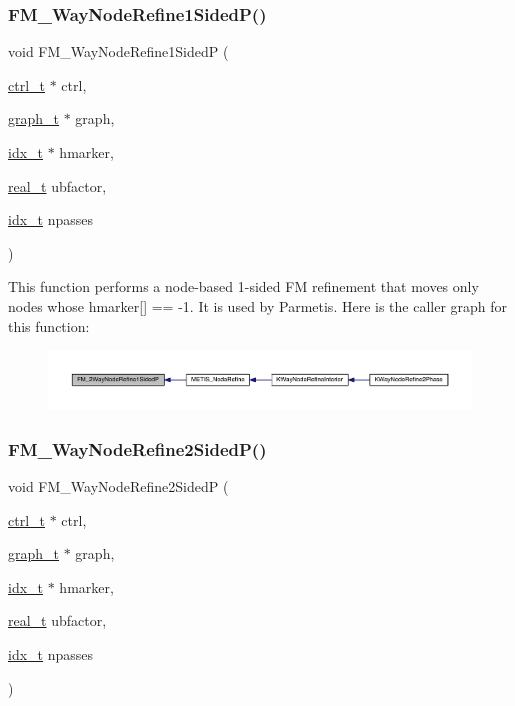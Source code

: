\subsubsection{\texorpdfstring{F\+M\+\_\+Way\+Node\+Refine1\+Sided\+P()}{FM\_2WayNodeRefine1SidedP()}}
{\footnotesize\ttfamily void F\+M\+\_\+Way\+Node\+Refine1\+SidedP (\begin{DoxyParamCaption}\item[{\hyperlink{a00742}{ctrl\+\_\+t} $\ast$}]{ctrl,  }\item[{\hyperlink{a00734}{graph\+\_\+t} $\ast$}]{graph,  }\item[{\hyperlink{a00876_aaa5262be3e700770163401acb0150f52}{idx\+\_\+t} $\ast$}]{hmarker,  }\item[{\hyperlink{a00876_a1924a4f6907cc3833213aba1f07fcbe9}{real\+\_\+t}}]{ubfactor,  }\item[{\hyperlink{a00876_aaa5262be3e700770163401acb0150f52}{idx\+\_\+t}}]{npasses }\end{DoxyParamCaption})}

This function performs a node-\/based 1-\/sided FM refinement that moves only nodes whose hmarker\mbox{[}\mbox{]} == -\/1. It is used by Parmetis. Here is the caller graph for this function\+:\nopagebreak
\begin{figure}[H]
\begin{center}
\leavevmode
\includegraphics[width=350pt]{a00939_a1d2b2b5145f4556102f25c25570bb80e_icgraph}
\end{center}
\end{figure}
\mbox{\label{a00939_a2e0b580a44dc7ec102b48ba7bf6b3797}} 
\subsubsection{\texorpdfstring{F\+M\+\_\+Way\+Node\+Refine2\+Sided\+P()}{FM\_2WayNodeRefine2SidedP()}}
{\footnotesize\ttfamily void F\+M\+\_\+Way\+Node\+Refine2\+SidedP (\begin{DoxyParamCaption}\item[{\hyperlink{a00742}{ctrl\+\_\+t} $\ast$}]{ctrl,  }\item[{\hyperlink{a00734}{graph\+\_\+t} $\ast$}]{graph,  }\item[{\hyperlink{a00876_aaa5262be3e700770163401acb0150f52}{idx\+\_\+t} $\ast$}]{hmarker,  }\item[{\hyperlink{a00876_a1924a4f6907cc3833213aba1f07fcbe9}{real\+\_\+t}}]{ubfactor,  }\item[{\hyperlink{a00876_aaa5262be3e700770163401acb0150f52}{idx\+\_\+t}}]{npasses }\end{DoxyParamCaption})}

